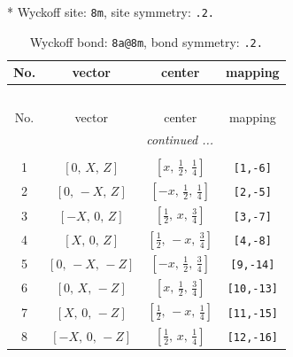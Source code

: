 \documentclass[fleqn,8pt]{jsarticle}
\begin{document}
* Wyckoff site: {\tt 8m}, site symmetry: {\tt .2.}
\renewcommand{\arraystretch}{1.2}
\begin{longtable}{cccc}
\caption{Wyckoff bond: {\tt 8a@8m}, bond symmetry: {\tt .2.}}
 \\
 \hline \hline
No. & vector & center & mapping \\ \hline \endfirsthead

\multicolumn{3}{l}{\tablename\ \thetable{}} \\
 \hline \hline
No. & vector & center & mapping \\ \hline \endhead

 \hline \hline
\multicolumn{3}{r}{\footnotesize\it continued ...} \\ \endfoot

 \hline \hline
\multicolumn{3}{r}{} \\ \endlastfoot

1 & $\left[ 0,\, X,\, Z \right]$ & $\left[ x,\, \frac{1}{2},\, \frac{1}{4} \right]$ & {\tt [1,-6]} \\ \hline
2 & $\left[ 0,\, - X,\, Z \right]$ & $\left[ - x,\, \frac{1}{2},\, \frac{1}{4} \right]$ & {\tt [2,-5]} \\ \hline
3 & $\left[ - X,\, 0,\, Z \right]$ & $\left[ \frac{1}{2},\, x,\, \frac{3}{4} \right]$ & {\tt [3,-7]} \\ \hline
4 & $\left[ X,\, 0,\, Z \right]$ & $\left[ \frac{1}{2},\, - x,\, \frac{3}{4} \right]$ & {\tt [4,-8]} \\ \hline
5 & $\left[ 0,\, - X,\, - Z \right]$ & $\left[ - x,\, \frac{1}{2},\, \frac{3}{4} \right]$ & {\tt [9,-14]} \\ \hline
6 & $\left[ 0,\, X,\, - Z \right]$ & $\left[ x,\, \frac{1}{2},\, \frac{3}{4} \right]$ & {\tt [10,-13]} \\ \hline
7 & $\left[ X,\, 0,\, - Z \right]$ & $\left[ \frac{1}{2},\, - x,\, \frac{1}{4} \right]$ & {\tt [11,-15]} \\ \hline
8 & $\left[ - X,\, 0,\, - Z \right]$ & $\left[ \frac{1}{2},\, x,\, \frac{1}{4} \right]$ & {\tt [12,-16]} \\
\end{longtable}
\renewcommand{\arraystretch}{1.2}
\end{document}
